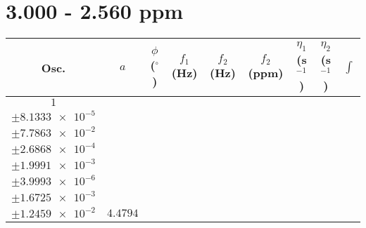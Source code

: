 \documentclass[8pt]{article}
\begin{document}
\section*{3.000 - 2.560 ppm}
\begin{longtable}[l]{c c c c c c c c c}
\toprule
Osc. & $a$ & $\phi$ ($^{\circ}$) & $f_1$ (Hz) & $f_2$ (Hz) & $f_2$ (ppm) & $\eta_1$ (s$^{-1}$) & $\eta_2$ (s$^{-1}$) & $\int$\\
\midrule
$\num{1}$ & \begin{tabular}[c]{@{}c@{}}$\num{6.0339e-2}$ \\ $\pm\num{8.1333e-5}$\end{tabular} & \begin{tabular}[c]{@{}c@{}}$\num{9.8642e-2}$ \\ $\pm\num{7.7863e-2}$\end{tabular} & \begin{tabular}[c]{@{}c@{}}$\num{-12.902}$ \\ $\pm\num{2.6868e-4}$\end{tabular} & \begin{tabular}[c]{@{}c@{}}$\num{1.3214e+3}$ \\ $\pm\num{1.9991e-3}$\end{tabular} & \begin{tabular}[c]{@{}c@{}}$\num{2.6435}$ \\ $\pm\num{3.9993e-6}$\end{tabular} & \begin{tabular}[c]{@{}c@{}}$\num{1.1595}$ \\ $\pm\num{1.6725e-3}$\end{tabular} & \begin{tabular}[c]{@{}c@{}}$\num{4.1606}$ \\ $\pm\num{1.2459e-2}$\end{tabular} & $\num{4.4794}$\\

\end{longtable}
\end{document}
